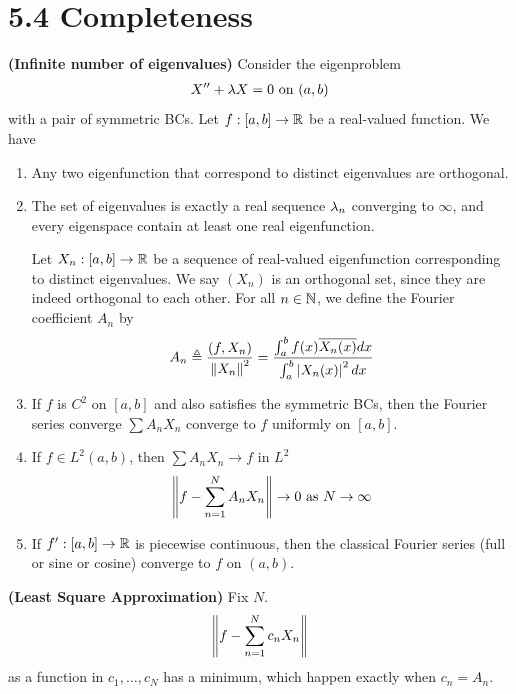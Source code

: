 \documentclass{report}
\begin{document}
\section{5.4 Completeness}
\begin{theorem}
\textbf{(Infinite number of eigenvalues)} Consider the eigenproblem 
\begin{align*}
X''+ \lambda  X=0\text{ on }(a,b)
\end{align*}
with a pair of symmetric BCs. Let $f:[a,b]\rightarrow \mathbb{R}$ be a real-valued function. We have
\begin{enumerate}[label=(\alph*)]
  \item Any two eigenfunction that correspond to distinct eigenvalues are orthogonal. 
  \item The set of eigenvalues is exactly a real sequence $\lambda_n$ converging to $\infty$, and every eigenspace contain at least one real eigenfunction. 
\begin{mdframed}
Let $X_n:[a,b]\rightarrow \mathbb{R}$ be a sequence of real-valued eigenfunction corresponding to distinct eigenvalues. We say $(X_n)$ is an orthogonal set, since they are indeed orthogonal to each other. For all $n\in\mathbb{N}$, we define the Fourier coefficient $A_n$ by 
 \begin{align*}
A_n \triangleq \frac{(f,X_n)}{\left\| X_n \right\|^2}=\frac{\int_a^b f(x)\overline{X_n(x)}dx}{\int_a^b \left|X_n(x)\right|^2 dx}
\end{align*}
\end{mdframed}
  \item If $f$ is  $C^2$ on $[a,b]$ and also satisfies the symmetric BCs, then the Fourier series converge $\sum A_nX_n$ converge to $f$ uniformly on  $[a,b]$.
  \item If $f \in L^2(a,b)$, then $\sum A_nX_n \to f$ in $L^2$
    \begin{align*}
    \left\| f - \sum_{n=1}^N A_nX_n \right\|\to 0\text{ as }N \to \infty 
    \end{align*}
  \item If $f':[a,b]\rightarrow \mathbb{R}$ is piecewise continuous, then the classical Fourier series  (full or sine or cosine) converge to $f$ on $(a,b)$.  
\end{enumerate}
\end{theorem}
\begin{theorem}
\textbf{(Least Square Approximation)} Fix $N$. 
 \begin{align*}
\left\| f- \sum_{n=1}^N c_nX_n \right\|
\end{align*}
as a function in $c_1,\dots ,c_N$ has a minimum, which happen exactly when $c_n=A_n$. 
\end{theorem}
\end{document}
